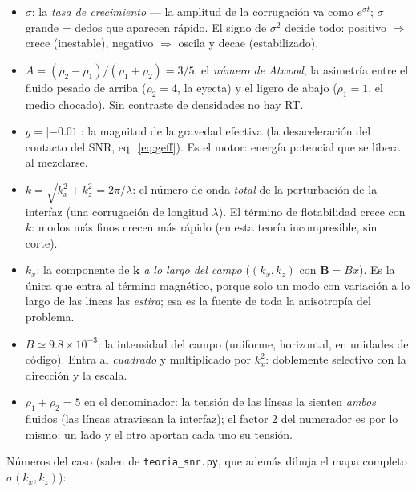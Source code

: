 \documentclass[11pt,a4paper]{article}
\begin{document}
\begin{itemize}[nosep]
  \item $\sigma$: la \emph{tasa de crecimiento} --- la amplitud de la corrugación va
  como $e^{\sigma t}$; $\sigma$ grande = dedos que aparecen rápido. El signo de
  $\sigma^2$ decide todo: positivo $\Rightarrow$ crece (inestable), negativo
  $\Rightarrow$ oscila y decae (estabilizado).
  \item $A=(\rho_2-\rho_1)/(\rho_1+\rho_2)=3/5$: el \emph{número de Atwood}, la
  asimetría entre el fluido pesado de arriba ($\rho_2=4$, la eyecta) y el ligero de
  abajo ($\rho_1=1$, el medio chocado). Sin contraste de densidades no hay RT.
  \item $g=|{-0.01}|$: la magnitud de la gravedad efectiva (la desaceleración del
  contacto del SNR, eq.~\ref{eq:geff}). Es el motor: energía potencial que se libera
  al mezclarse.
  \item $k=\sqrt{k_x^2+k_z^2}=2\pi/\lambda$: el número de onda \emph{total} de la
  perturbación de la interfaz (una corrugación de longitud $\lambda$). El término de
  flotabilidad crece con $k$: modos más finos crecen más rápido (en esta teoría
  incompresible, sin corte).
  \item $k_x$: la componente de $\mathbf{k}$ \emph{a lo largo del campo}
  ($(k_x,k_z)$ con $\mathbf{B}=B\hat{x}$). Es la única que entra al término
  magnético, porque solo un modo con variación a lo largo de las líneas las
  \emph{estira}; esa es la fuente de toda la anisotropía del problema.
  \item $B\simeq9.8\times10^{-3}$: la intensidad del campo (uniforme, horizontal,
  en unidades de código). Entra al \emph{cuadrado} y multiplicado por $k_x^2$:
  doblemente selectivo con la dirección y la escala.
  \item $\rho_1+\rho_2=5$ en el denominador: la tensión de las líneas la sienten
  \emph{ambos} fluidos (las líneas atraviesan la interfaz); el factor 2 del
  numerador es por lo mismo: un lado y el otro aportan cada uno su tensión.
\end{itemize}

Números del caso (salen de \texttt{teoria\_snr.py}, que además dibuja el mapa completo
$\sigma(k_x,k_z)$):
\end{document}
